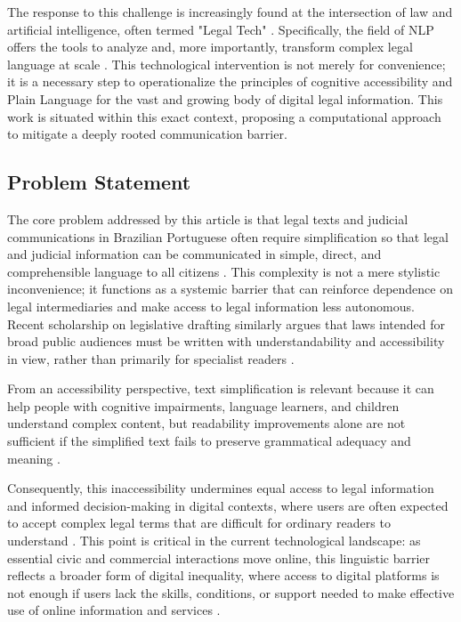 \documentclass[english]{UNISINOSartigo} %
\begin{document}
The response to this challenge is increasingly found at the intersection of law and artificial intelligence, often termed "Legal Tech" \cite{porto2024iagenerativa}. Specifically, the field of NLP offers the tools to analyze and, more importantly, transform complex legal language at scale \cite{ariai2025nlp}. This technological intervention is not merely for convenience; it is a necessary step to operationalize the principles of cognitive accessibility and Plain Language for the vast and growing body of digital legal information. This work is situated within this exact context, proposing a computational approach to mitigate a deeply rooted communication barrier.

\subsection{Problem Statement}

The core problem addressed by this article is that legal texts and judicial communications in Brazilian Portuguese often require simplification so that legal and judicial information can be communicated in simple, direct, and comprehensible language to all citizens \cite{cnj2023pacto}. This complexity is not a mere stylistic inconvenience; it functions as a systemic barrier that can reinforce dependence on legal intermediaries and make access to legal information less autonomous. Recent scholarship on legislative drafting similarly argues that laws intended for broad public audiences must be written with understandability and accessibility in view, rather than primarily for specialist readers \cite{zariski2026plain}.

From an accessibility perspective, text simplification is relevant because it can help people with cognitive impairments, language learners, and children understand complex content, but readability improvements alone are not sufficient if the simplified text fails to preserve grammatical adequacy and meaning \cite{alissa2023text}.

Consequently, this inaccessibility undermines equal access to legal information and informed decision-making in digital contexts, where users are often expected to accept complex legal terms that are difficult for ordinary readers to understand \cite{benoliel2019unreadable}. This point is critical in the current technological landscape: as essential civic and commercial interactions move online, this linguistic barrier reflects a broader form of digital inequality, where access to digital platforms is not enough if users lack the skills, conditions, or support needed to make effective use of online information and services \cite{lythreatis2022digitaldivide}.
\end{document}

